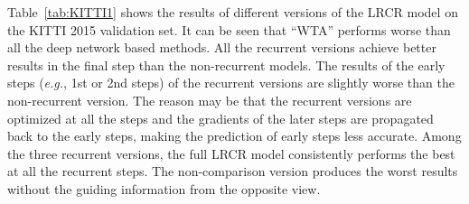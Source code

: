 \documentclass[10pt,twocolumn,letterpaper]{article}
\begin{document}
 Table~\ref{tab:KITTI1} shows the results of different versions of the LRCR model on the KITTI 2015 validation set. It can be seen that ``WTA'' performs worse than all the deep network based methods. All the recurrent versions achieve better results in the final step than the non-recurrent models. The results of the early steps (\emph{e.g.}, 1st or 2nd steps) of the recurrent versions are slightly worse than the non-recurrent version. The reason may be that the recurrent versions are optimized at all the steps and the gradients of the later steps are propagated back to the early steps, making the prediction of early steps less accurate. Among the three recurrent versions, the full LRCR model consistently performs the best at all the recurrent steps. The non-comparison version produces the worst results without the guiding information from the opposite view.
 
\end{document}

